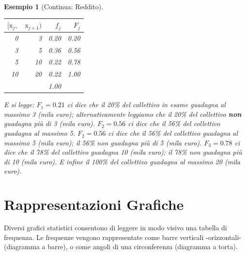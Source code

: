 \documentclass[
  11pt,
]{book}
\theoremstyle{mytheoremstyle}
\theoremstyle{mydefstyle}
\newtheorem{example}{{Esempio}}[section]
\begin{document}
\begin{example}[Continua: Reddito]
\(\phantom{.}\)

\begin{center}

\begin{table}[H]
\centering
\begin{tabular}[t]{rrrr}
\toprule
$[\text{x}_j,$ & $\text{x}_{j+1})$ & $f_j$ & $F_j$\\
\midrule
0 & 3 & 0.20 & 0.20\\
3 & 5 & 0.36 & 0.56\\
5 & 10 & 0.22 & 0.78\\
10 & 20 & 0.22 & 1.00\\
 &  & 1.00 & \\
\bottomrule
\end{tabular}
\end{table}

\end{center}

E si legge: \(F_1=0.21\) ci dice che il 20\% del collettivo in esame guadagna al massimo 3 (mila euro); alternativamente leggiamo che il 20\% del collettivo \textbf{non} guadagna più di 3 (mila euro). \(F_2=0.56\) ci dice che il 56\% del collettivo guadagna al massimo 5. \(F_2=0.56\) ci dice che il 56\% del collettivo guadagna al massimo 5 (mila euro); il 56\% non guadagna più di 5 (mila euro). \(F_3=0.78\) ci dice che il 78\% del collettivo guadagna 10 (mila euro); il 78\% non guadagna più di 10 (mila euro). E infine il 100\% del collettivo guadagna al massimo 20 (mila euro).
\end{example}

\section{Rappresentazioni Grafiche}\label{rappresentazioni-grafiche}

Diversi grafici statistici consentono di leggere in modo visivo una tabella di frequenza.
Le frequenze vengono rappresentate come barre verticali -orizzontali- (diagramma a barre),
o come angoli di una circonferenza (diagramma a torta).
\end{document}
